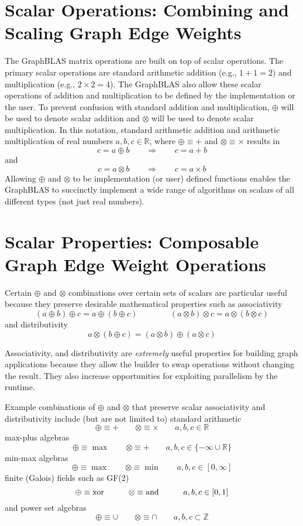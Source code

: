\section{Scalar Operations: Combining and Scaling Graph Edge Weights}
  The GraphBLAS matrix operations are built on top of scalar operations.  The primary scalar operations are standard arithmetic addition (e.g., $1 + 1 = 2$) and multiplication (e.g., $2 \times 2 = 4$).  The GraphBLAS also allow these scalar operations of addition and multiplication to be defined by the implementation or the user.  To prevent confusion with standard addition and multiplication, $\oplus$ will be used to denote scalar addition and $\otimes$ will be used to denote scalar multiplication.  In this notation, standard arithmetic addition and arithmetic multiplication of real numbers $a, b, c \in \mathbb{R}$, where $\oplus \equiv +$ and $\otimes \equiv \times$ results in
$$
   c = a \oplus b  ~~~~~~~~~ \Rightarrow ~~~~~~~~~ c = a + b
$$
and
$$
   c = a \otimes b  ~~~~~~~~~ \Rightarrow ~~~~~~~~~ c = a \times b
$$
Allowing $\oplus$ and $\otimes$ to be implementation (or user) defined functions enables the GraphBLAS to succinctly implement a wide range of algorithms on scalars of all different types (not just real numbers).

\section{Scalar Properties: Composable Graph Edge Weight Operations}
  Certain $\oplus$ and $\otimes$ combinations  over certain sets of scalars are particular useful because they preserve desirable mathematical properties such as
associativity
$$
 (a \oplus b) \oplus c = a \oplus (b \oplus c) ~~~~~~~~~ ~~~~~~~~~ (a \otimes b) \otimes c = a \otimes (b \otimes c)
$$
and distributivity
$$
 a \otimes (b \oplus c)  = (a \otimes b) \oplus (a \otimes c)
$$

Associativity, and distributivity are \emph{extremely} useful properties for building graph applications because they allow the builder to swap operations without changing the result. They also increase opportunities for exploiting parallelism by the runtime. 

  Example combinations of $\oplus$ and $\otimes$ that preserve scalar associativity and distributivity include (but are not limited to) standard arithmetic
$$
  \oplus \equiv + ~~~~~~~~~ \otimes \equiv \times ~~~~~~~~~ a, b, c \in \mathbb{R}
$$
max-plus algebras
$$
  \oplus \equiv \max ~~~~~~~~~ \otimes \equiv + ~~~~~~~~~ a, b, c \in \{-\infty \cup \mathbb{R}\}
$$
min-max algebras
$$
  \oplus \equiv \max ~~~~~~~~~ \otimes \equiv \min ~~~~~~~~~ a, b, c \in [0,\infty]
$$
finite (Galois) fields such as GF(2)
$$
  \oplus \equiv {\rm xor} ~~~~~~~~~ \otimes \equiv {\rm and} ~~~~~~~~~ a, b, c \in [0,1]
$$
and power set algebras
$$
  \oplus \equiv \cup ~~~~~~~~~ \otimes \equiv \cap ~~~~~~~~~ a, b, c \subset \mathbb{Z}
$$

